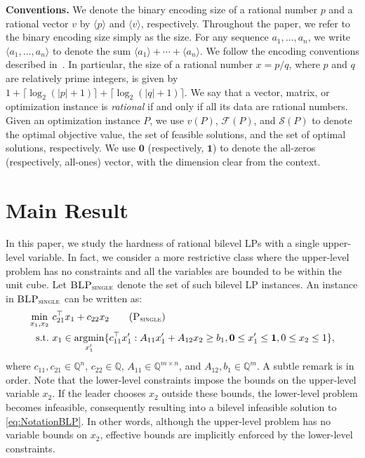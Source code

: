 \documentclass[runningheads,orivec]{llncs}
\newcommand{\MacroColor}[1]{#1}
\DeclareMathOperator*{\Argmin}{\MacroColor{argmin}}
\newcommand{\Size}[1]{\langle#1\rangle}
\newcommand{\ZeroVector}{\mathbf{0}}
\newcommand{\OneVector}{\mathbf{1}}
\newcommand{\BLPWithSingleUpperLevelVariable}{\MacroColor{$\textsc{BLP}_{\textsc{single}}$}}
\newcommand{\NVariables}{\MacroColor{n}}
\newcommand{\NConstraints}{\MacroColor{m}}
\newcommand{\OptValFunc}{\MacroColor{v}}
\newcommand{\OptSolSet}{\MacroColor{\mathcal{S}}}
\newcommand{\FeasSolSet}{\MacroColor{\mathcal{F}}}
\begin{document}
\textbf{Conventions.}
We denote the binary encoding size of a rational number $p$ and a rational vector $v$ by $\Size{p}$ and $\Size{v}$, respectively.
Throughout the paper, we refer to the binary encoding size simply as the size.
For any sequence $a_1, \ldots, a_n$, we write $\Size{a_1, \ldots, a_n}$ to denote the sum $\Size{a_1} + \cdots + \Size{a_n}$.
We follow the encoding conventions described in~\cite{Schrijver1998}.
In particular, the size of a rational number $x = p/q$, where $p$ and $q$ are relatively prime integers, is given by $1 + \lceil \log_2(|p| + 1) \rceil + \lceil \log_2(|q| + 1) \rceil$.
We say that a vector, matrix, or optimization instance is \emph{rational} if and only if all its data are rational numbers.
Given an optimization instance $P$, we use $\OptValFunc(P)$, $\FeasSolSet(P)$, and $\OptSolSet(P)$ to denote the optimal objective value, the set of feasible solutions, and the set of optimal solutions, respectively.
We use $\ZeroVector$ (respectively, $\OneVector$) to denote the all-zeros (respectively, all-ones) vector, with the dimension clear from the context.

\section{Main Result}
\label{sec:MainResult}

In this paper, we study the hardness of rational bilevel LPs with a single upper-level variable.
In fact, we consider a more restrictive class where the upper-level problem has no constraints and all the variables are bounded to be within the unit cube.
Let \BLPWithSingleUpperLevelVariable{} denote the set of such bilevel LP instances.
An instance in \BLPWithSingleUpperLevelVariable{} can be written as:
\begin{align}
\min_{x_1, x_2} \ &
c_{2 1}^{\top} x_1 + c_{2 2} x_2
\tag{$\textsc{P}_{\textsc{single}}$}
\label{eq:NotationBLP}
\\
\text{s.t.} \
&
x_1 \in \Argmin_{x_1'} \{ c_{1 1}^{\top} x_1' : A_{1 1} x_1' + A_{1 2} x_2 \ge b_1,
\ZeroVector \le x_1' \le \OneVector, 0 \le x_2 \le 1
\}, \notag
\end{align}
where $c_{1 1}, c_{2 1} \in \mathbb{Q}^{\NVariables}$, $c_{2 2} \in \mathbb{Q}$, $A_{1 1} \in \mathbb{Q}^{\NConstraints \times \NVariables}$, and $A_{1 2}, b_1 \in \mathbb{Q}^{\NConstraints}$.
A subtle remark is in order. Note that the lower-level constraints impose the bounds on the upper-level variable $x_2$.
If the leader chooses $x_2$ outside these bounds, the lower-level problem becomes infeasible, consequently resulting into a bilevel infeasible solution to \eqref{eq:NotationBLP}.
In other words, although the upper-level problem has no variable bounds on $x_2$, effective bounds are implicitly enforced by the lower-level constraints.
\end{document}

